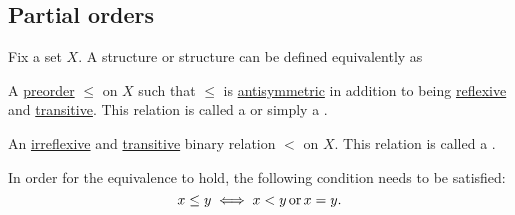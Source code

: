 \subsection{Partial orders}\label{subsec:partial_orders}

\begin{definition}\label{def:poset}
  Fix a set \( X \). A  structure or  structure can be defined equivalently as
  \begin{defenum}
     A \hyperref[def:preordered_set]{preorder} \( \leq \) on \( X \) such that \( \leq \) is \hyperref[def:binary_relation/antisymmetric]{antisymmetric} in addition to being \hyperref[def:binary_relation/reflexive]{reflexive} and \hyperref[def:binary_relation/transitive]{transitive}. This relation is called a  or simply a .

     An \hyperref[def:binary_relation/irreflexive]{irreflexive} and \hyperref[def:binary_relation/transitive]{transitive} binary relation \( < \) on \( X \). This relation is called a .
  \end{defenum}

  In order for the equivalence to hold, the following condition needs to be satisfied:
  \begin{equation*}
    x \leq y \iff x < y \mathop{\text{or}} x = y.
  \end{equation*}
\end{definition}
